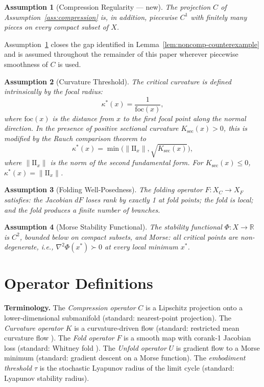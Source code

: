 \documentclass[14pt,a4paper]{extarticle}
\newtheorem{assumption}{Assumption}[section]
\begin{document}
\begin{assumption}[Compression Regularity --- new]
\label{ass:compression-reg}
The projection $C$ of Assumption~\ref{ass:compression} is, in addition,
piecewise $C^1$ with finitely many pieces on every compact subset of $X$.
\end{assumption}

\noindent Assumption~\ref{ass:compression-reg} closes the gap identified
in Lemma~\ref{lem:noncomp-counterexample} and is assumed throughout the
remainder of this paper wherever piecewise smoothness of $C$ is used.

\begin{assumption}[Curvature Threshold]
\label{ass:kappa}
The critical curvature is defined intrinsically by the focal radius:
\[
  \kappa^*(x) = \frac{1}{\mathrm{foc}(x)},
\]
where $\mathrm{foc}(x)$ is the distance from $x$ to the first focal
point along the normal direction.
In the presence of positive sectional curvature $K_\mathrm{sec}(x) > 0$,
this is modified by the Rauch comparison theorem to
\[
  \kappa^*(x) = \min\!\bigl(\|\mathrm{II}_x\|,
    \sqrt{K_\mathrm{sec}(x)}\bigr),
\]
where $\|\mathrm{II}_x\|$ is the norm of the second fundamental form.
For $K_\mathrm{sec}(x) \leq 0$, $\kappa^*(x) = \|\mathrm{II}_x\|$.
\end{assumption}

\begin{assumption}[Folding Well-Posedness]
\label{ass:fold}
The folding operator $F : X_C \to X_F$ satisfies: the Jacobian $dF$
loses rank by exactly 1 at fold points; the fold is local; and the
fold produces a finite number of branches.
\end{assumption}

\begin{assumption}[Morse Stability Functional]
\label{ass:morse}
The stability functional $\Phi : X \to \mathbb{R}$ is $C^2$, bounded
below on compact subsets, and Morse: all critical points are
non-degenerate, i.e., $\nabla^2\Phi(x^*) \succ 0$ at every local
minimum $x^*$.
\end{assumption}

\section{Operator Definitions}
\label{sec:operators}

\noindent\textbf{Terminology.}
The \emph{Compression operator} $C$ is a Lipschitz projection onto a
lower-dimensional submanifold (standard: nearest-point projection).
The \emph{Curvature operator} $K$ is a curvature-driven flow
(standard: restricted mean curvature flow \cite{GolubitskyGuillemin1973}).
The \emph{Fold operator} $F$ is a smooth map with corank-1 Jacobian loss
(standard: Whitney fold \cite{Whitney1955}).
The \emph{Unfold operator} $U$ is gradient flow to a Morse minimum
(standard: gradient descent on a Morse function).
The \emph{embodiment threshold} $\tau$ is the stochastic Lyapunov radius
of the limit cycle (standard: Lyapunov stability radius).
\end{document}
